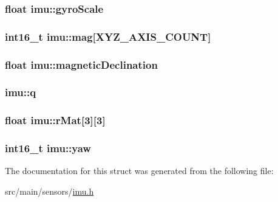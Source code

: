 \hypertarget{structimu_a45a70878798abc053965cd42e847ed5f}{
\subsubsection[{gyro\+Scale}]{\setlength{\rightskip}{0pt plus 5cm}float imu\+::gyro\+Scale}}\label{structimu_a45a70878798abc053965cd42e847ed5f}
\hypertarget{structimu_a8c183c7e7dc50b83141db4c75089a3c2}{
\subsubsection[{mag}]{\setlength{\rightskip}{0pt plus 5cm}int16\+\_\+t imu\+::mag\mbox{[}{\bf X\+Y\+Z\+\_\+\+A\+X\+I\+S\+\_\+\+C\+O\+U\+N\+T}\mbox{]}}}\label{structimu_a8c183c7e7dc50b83141db4c75089a3c2}
\hypertarget{structimu_a472b36b356e3efaacac429582cdce080}{
\subsubsection[{magnetic\+Declination}]{\setlength{\rightskip}{0pt plus 5cm}float imu\+::magnetic\+Declination}}\label{structimu_a472b36b356e3efaacac429582cdce080}
\hypertarget{structimu_aff0979d5140e3b0cb4531e7e1901728f}{
\subsubsection[{q}]{ imu\+::q}}\label{structimu_aff0979d5140e3b0cb4531e7e1901728f}
\hypertarget{structimu_a6d69701dfc71932e6309366f9addadda}{
\subsubsection[{r\+Mat}]{\setlength{\rightskip}{0pt plus 5cm}float imu\+::r\+Mat\mbox{[}3\mbox{]}\mbox{[}3\mbox{]}}}\label{structimu_a6d69701dfc71932e6309366f9addadda}
\hypertarget{structimu_ad88aa77e4111f3d9ac702e81cd1d02dd}{
\subsubsection[{yaw}]{\setlength{\rightskip}{0pt plus 5cm}int16\+\_\+t imu\+::yaw}}\label{structimu_ad88aa77e4111f3d9ac702e81cd1d02dd}


The documentation for this struct was generated from the following file\+:\begin{DoxyCompactItemize}
\item 
src/main/sensors/\hyperlink{sensors_2imu_8h}{imu.\+h}\end{DoxyCompactItemize}
